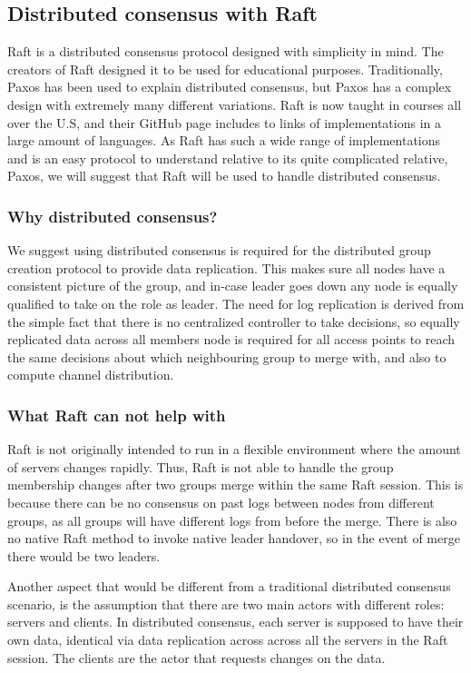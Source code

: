 \subsection{Distributed consensus with Raft}
Raft \cite{raftio} is a distributed consensus protocol designed with simplicity in mind. The creators of Raft designed it to be used for educational purposes. Traditionally, Paxos has been used to explain distributed consensus, but Paxos has a complex design with extremely many different variations. Raft is now taught in courses all over the U.S, and their GitHub page includes to links
of implementations in a large amount of languages. As Raft has such a wide range of implementations and is an easy protocol to understand relative to its quite complicated relative, Paxos, 
we will suggest that Raft will be used to handle distributed consensus. 

\subsubsection{Why distributed consensus?}
We suggest using distributed consensus is required for the distributed group creation protocol to provide data replication.
This makes sure all nodes have a consistent picture of the group, and in-case leader goes down any node is equally qualified to take on the role as leader.
The need for log replication is derived from the simple fact that there is no centralized controller to take decisions, so equally replicated data across all members node is required for all access
points to reach the same decisions about which neighbouring group to merge with, and also to compute channel distribution.  

\subsubsection{What Raft can not help with}
Raft is not originally intended to run in a flexible environment where the amount of servers changes rapidly. Thus, Raft is not able to handle the group membership changes
after two groups merge within the same Raft session. This is because there can be no consensus on past logs between nodes from different groups, as all groups will have different logs from before the merge. There is also no native Raft method to invoke native leader handover, so in the event of merge there would be two leaders. 

Another aspect that would be different from a traditional distributed consensus scenario, is the assumption that there are two main actors with different roles: servers and clients.
In distributed consensus, each server is supposed to have their own data, identical via data replication across across all the servers in the Raft session. The clients are the actor that requests 
changes on the data.

